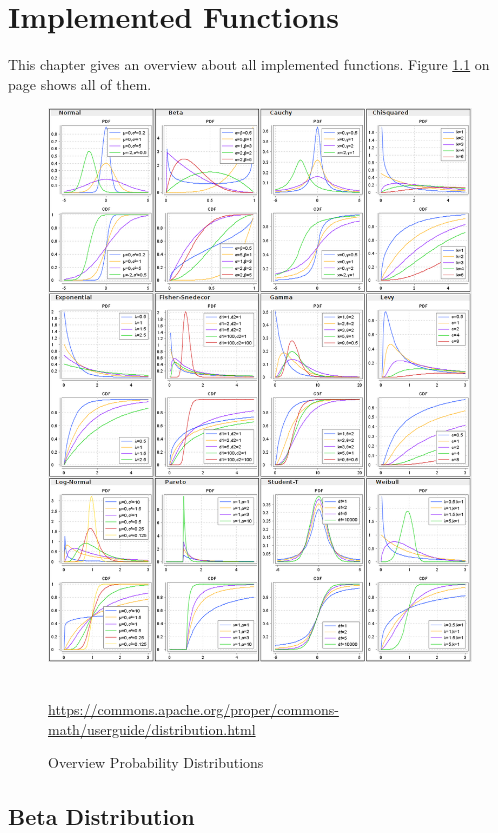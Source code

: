 
\chapter{Implemented Functions}

	This chapter gives an overview about all implemented functions. Figure \ref{fig:OverviewProbabilityDistributions} on page \pageref{fig:OverviewProbabilityDistributions} shows all of them.

	\begin{figure}[h]
		\centering
		\includegraphics[width=1\textwidth]{Figures/OverviewProbabilityDistributions}~\\
		\caption{Overview Probability Distributions}
		\url{https://commons.apache.org/proper/commons-math/userguide/distribution.html}
		\label{fig:OverviewProbabilityDistributions}
	\end{figure}

	\section{Beta Distribution} \label{sec:beta_distribution}

